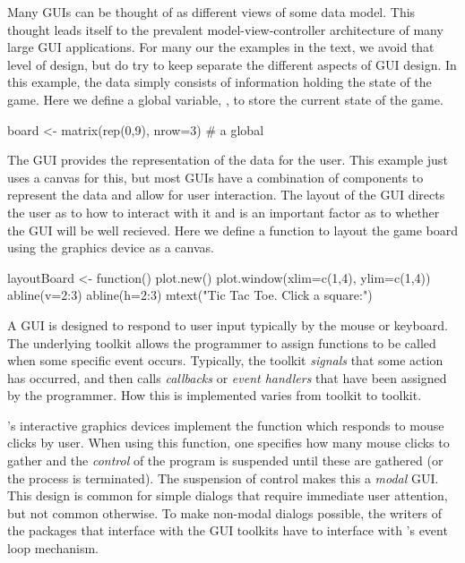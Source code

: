 Many GUIs can be thought of as different views of some data
model. This thought leads itself to the prevalent
model-view-controller architecture of many large GUI applications. For
many our the examples in the text, we avoid that level of design, but
do try to keep separate the different aspects of GUI design. In
this example, the data simply consists of information holding the
state of the game. Here we define a global variable, , to store the
current state of the game. 

\begin{Schunk}
\begin{Sinput}
 board <- matrix(rep(0,9), nrow=3)       # a global
\end{Sinput}
\end{Schunk}

The GUI provides the representation of the data for the user. This
example just uses a canvas for this, but most GUIs have a combination
of components to represent the data and allow for user
interaction. The layout of the GUI directs the user as to how to
interact with it and is an important factor as to whether the GUI will
be well recieved. Here we define a function to layout the game board
using the graphics device as a canvas.

\begin{Schunk}
\begin{Sinput}
 layoutBoard <- function() {
   plot.new()
   plot.window(xlim=c(1,4), ylim=c(1,4))
   abline(v=2:3)
   abline(h=2:3)
   mtext("Tic Tac Toe. Click a square:")
 }
\end{Sinput}
\end{Schunk}

A GUI is designed to respond to user input typically by the mouse or
keyboard. The underlying toolkit allows the programmer to assign
functions to be called when some specific event occurs. Typically, the
toolkit \textit{signals} that some action has occurred, and then
calls \textit{callbacks} or \textit{event handlers} that have been
assigned by the programmer. How this is implemented varies from
toolkit to toolkit.

\R's interactive graphics devices implement the 
function which responds to mouse clicks by user. When using this function,
one specifies how many mouse clicks to gather and the \textit{control}
of the program is suspended until these are gathered (or the process
is terminated). The suspension of control makes this a \textit{modal}
GUI. This design is common for simple dialogs that require immediate
user attention, but not common otherwise. To make non-modal dialogs
possible, the writers of the \R\/ packages that interface with the GUI
toolkits have to interface with \R's event loop mechanism.


